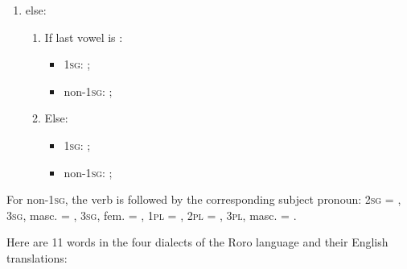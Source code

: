 \begin{refsection}
\begin{mysolution}
\begin{enumerate}
\vspace*{-\multicolsep}
\begin{multicols}{2}
\begin{itemize}
    \item 1\textsc{sg}: ;
    \item non-1\textsc{sg}: ;
    \end{itemize}
\end{multicols}
\vspace*{-\multicolsep}
\item else:
\begin{enumerate}
    \item If last vowel is :
    \vspace*{-\multicolsep}
\begin{multicols}{2}
\begin{itemize}
    \item 1\textsc{sg}: ;

    \item non-1\textsc{sg}: ;
\end{itemize}
\end{multicols}
\vspace*{-\multicolsep}
\item Else:
\vspace*{-\multicolsep}
\begin{multicols}{2}
\begin{itemize}
    \item 1\textsc{sg}: ;
    \item non-1\textsc{sg}: ;
    \end{itemize}
\end{multicols}
\vspace*{-\multicolsep}
\end{enumerate}
\end{enumerate}

For non-1\textsc{sg}, the verb is followed by the corresponding subject pronoun: 2\textsc{sg} = , 3\textsc{sg}, masc. = , 3\textsc{sg}, fem. = , 1\textsc{pl} = , 2\textsc{pl} = , 3\textsc{pl}, masc. = .
\end{mysolution}

\begin{problem}{\langnameRoro}{\nameVBelikov}{}
Here are 11 words in the four dialects of the Roro language and their English translations:


\end{problem}
\end{refsection}
